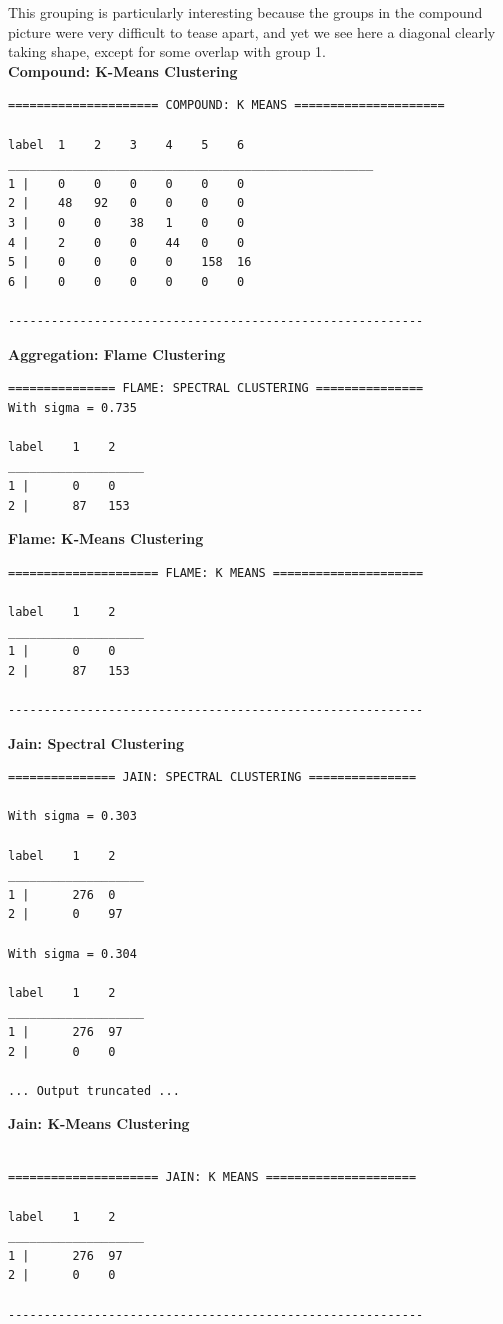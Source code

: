 \documentclass[11pt]{article}
\begin{document}
This grouping is particularly interesting because the groups in the compound picture were very difficult to tease apart, and yet we see here a diagonal clearly taking shape, except for some overlap with group 1.
\\[5pt]
\textbf{Compound: K-Means Clustering} 
\begin{verbatim}
===================== COMPOUND: K MEANS =====================

label  1    2    3    4    5    6    
___________________________________________________
1 |    0    0    0    0    0    0    
2 |    48   92   0    0    0    0    
3 |    0    0    38   1    0    0    
4 |    2    0    0    44   0    0    
5 |    0    0    0    0    158  16    
6 |    0    0    0    0    0    0    

----------------------------------------------------------

\end{verbatim}
\textbf{Aggregation: Flame Clustering} 
\begin{verbatim}
=============== FLAME: SPECTRAL CLUSTERING ===============
With sigma = 0.735

label    1    2    
___________________
1 |      0    0    
2 |      87   153    

\end{verbatim}
\textbf{Flame: K-Means Clustering} 
\begin{verbatim}
===================== FLAME: K MEANS =====================

label    1    2    
___________________
1 |      0    0    
2 |      87   153    

----------------------------------------------------------

\end{verbatim}
\textbf{Jain: Spectral Clustering} 
\begin{verbatim}
=============== JAIN: SPECTRAL CLUSTERING ===============

With sigma = 0.303

label    1    2    
___________________
1 |      276  0    
2 |      0    97    

With sigma = 0.304

label    1    2    
___________________
1 |      276  97    
2 |      0    0    

... Output truncated ... 	

\end{verbatim}
\textbf{Jain: K-Means Clustering} 
\begin{verbatim}

===================== JAIN: K MEANS =====================

label    1    2    
___________________
1 |      276  97    
2 |      0    0    

----------------------------------------------------------

\end{verbatim}
\end{document}
